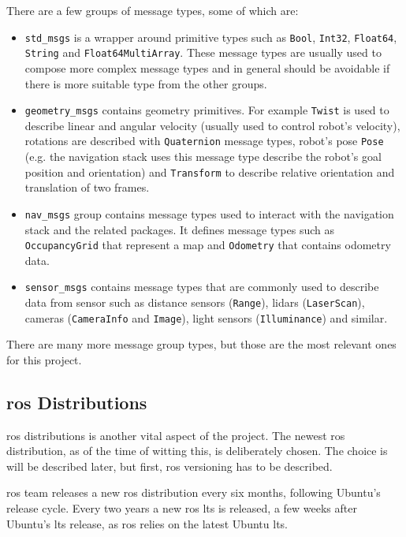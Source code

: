 There are a few groups of message types, some of which are:
\begin{itemize}
    \item \texttt{std\_msgs} is a wrapper around primitive types such as \texttt{Bool}, \texttt{Int32}, \texttt{Float64}, \texttt{String} and \texttt{Float64MultiArray}.
    These message types are usually used to compose more complex message types and in general should be avoidable if there is more suitable type from the other groups.
    \item \texttt{geometry\_msgs} contains geometry primitives.
    For example \texttt{Twist} is used to describe linear and angular velocity (usually used to control robot's velocity), rotations are described with \texttt{Quaternion} message types, robot's pose \texttt{Pose} (e.g. the navigation stack uses this message type describe the robot's goal position and orientation) and \texttt{Transform} to describe relative orientation and translation of two frames.
    \item \texttt{nav\_msgs} group contains message types used to interact with the navigation stack and the related packages.
    It defines message types such as \texttt{OccupancyGrid} that represent a map and \texttt{Odometry} that contains odometry data. 
    \item \texttt{sensor\_msgs} contains message types that are commonly used to describe data from sensor such as distance sensors (\texttt{Range}), \acsp{lidar} (\texttt{LaserScan}), cameras (\texttt{CameraInfo} and \texttt{Image}), light sensors (\texttt{Illuminance}) and similar. 
\end{itemize}

There are many more message group types, but those are the most relevant ones for this project.

\subsection{\ac{ros} Distributions}

\ac{ros} distributions is another vital aspect of the project.
The newest \ac{ros} distribution, as of the time of witting this, is deliberately chosen.
The choice is will be described later, but first, \ac{ros} versioning has to be described.

\ac{ros} team releases a new \ac{ros} distribution every six months, following Ubuntu's release cycle.
Every two years a new \ac{ros} \ac{lts} is released,
a few weeks after Ubuntu's \ac{lts} release, as \ac{ros} relies on the latest Ubuntu \ac{lts}.

